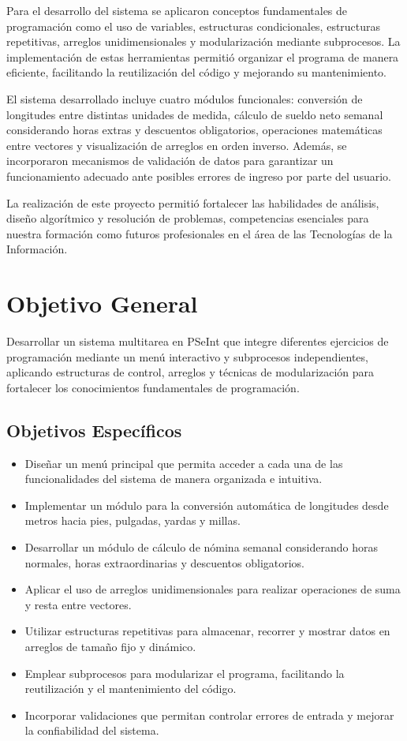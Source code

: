 \documentclass[12pt,a4paper]{article}
\begin{document}
	Para el desarrollo del sistema se aplicaron conceptos fundamentales de programación como el uso de variables, estructuras condicionales, estructuras repetitivas, arreglos unidimensionales y modularización mediante subprocesos. La implementación de estas herramientas permitió organizar el programa de manera eficiente, facilitando la reutilización del código y mejorando su mantenimiento.
	
	El sistema desarrollado incluye cuatro módulos funcionales: conversión de longitudes entre distintas unidades de medida, cálculo de sueldo neto semanal considerando horas extras y descuentos obligatorios, operaciones matemáticas entre vectores y visualización de arreglos en orden inverso. Además, se incorporaron mecanismos de validación de datos para garantizar un funcionamiento adecuado ante posibles errores de ingreso por parte del usuario.
	
	La realización de este proyecto permitió fortalecer las habilidades de análisis, diseño algorítmico y resolución de problemas, competencias esenciales para nuestra formación como futuros profesionales en el área de las Tecnologías de la Información.
	
	\section{\textcolor{azulUNEMI}{Objetivo General}}
	
	
	Desarrollar un sistema multitarea en PSeInt que integre diferentes ejercicios de programación mediante un menú interactivo y subprocesos independientes, aplicando estructuras de control, arreglos y técnicas de modularización para fortalecer los conocimientos fundamentales de programación.
	
		\subsection{\textcolor{azulUNEMI}{Objetivos Específicos}}
	
	
	\begin{itemize}
		\item Diseñar un menú principal que permita acceder a cada una de las funcionalidades del sistema de manera organizada e intuitiva.
		\item Implementar un módulo para la conversión automática de longitudes desde metros hacia pies, pulgadas, yardas y millas.
		\item Desarrollar un módulo de cálculo de nómina semanal considerando horas normales, horas extraordinarias y descuentos obligatorios.
		\item Aplicar el uso de arreglos unidimensionales para realizar operaciones de suma y resta entre vectores.
		\item Utilizar estructuras repetitivas para almacenar, recorrer y mostrar datos en arreglos de tamaño fijo y dinámico.
		\item Emplear subprocesos para modularizar el programa, facilitando la reutilización y el mantenimiento del código.
		\item Incorporar validaciones que permitan controlar errores de entrada y mejorar la confiabilidad del sistema.
	\end{itemize}
	
\end{document}
